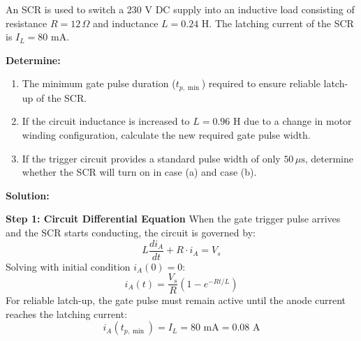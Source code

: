 \documentclass[11pt,a4paper]{article}
\begin{document}
\begin{examplebox}
An SCR is used to switch a $230\text{ V}$ DC supply into an inductive load consisting of resistance $R = 12\,\Omega$ and inductance $L = 0.24\text{ H}$. The latching current of the SCR is $I_L = 80\text{ mA}$.

\textbf{Determine:}
\begin{enumerate}[label=(\alph*)]
  \item The minimum gate pulse duration ($t_{p,\min}$) required to ensure reliable latch-up of the SCR.
  \item If the circuit inductance is increased to $L = 0.96\text{ H}$ due to a change in motor winding configuration, calculate the new required gate pulse width.
  \item If the trigger circuit provides a standard pulse width of only $50\,\mu\text{s}$, determine whether the SCR will turn on in case (a) and case (b).
\end{enumerate}

\tcblower
\textbf{Solution:}

\textbf{Step 1: Circuit Differential Equation}
When the gate trigger pulse arrives and the SCR starts conducting, the circuit is governed by:
\begin{equation}
L \frac{di_A}{dt} + R \cdot i_A = V_s
\end{equation}
Solving with initial condition $i_A(0) = 0$:
\begin{equation}
i_A(t) = \frac{V_s}{R} \left(1 - e^{-R t / L}\right)
\end{equation}
For reliable latch-up, the gate pulse must remain active until the anode current reaches the latching current:
\begin{equation}
i_A(t_{p,\min}) = I_L = 80\text{ mA} = 0.08\text{ A}
\end{equation}


\end{examplebox}
\end{document}
